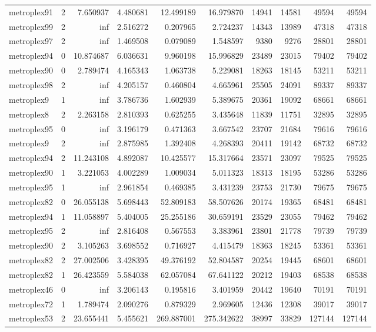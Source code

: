 \begin{longtable}{|l|r|r|r|r|r|r|r|r|r|}
metroplex91 & 2 & 7.650937 & 4.480681 & 12.499189 & 16.979870 & 14941 & 14581 & 49594 & 49594 \\
metroplex99 & 2 & inf & 2.516272 & 0.207965 & 2.724237 & 14343 & 13989 & 47318 & 47318 \\
metroplex97 & 2 & inf & 1.469508 & 0.079089 & 1.548597 & 9380 & 9276 & 28801 & 28801 \\
metroplex94 & 0 & 10.874687 & 6.036631 & 9.960198 & 15.996829 & 23489 & 23015 & 79402 & 79402 \\
metroplex90 & 0 & 2.789474 & 4.165343 & 1.063738 & 5.229081 & 18263 & 18145 & 53211 & 53211 \\
metroplex98 & 2 & inf & 4.205157 & 0.460804 & 4.665961 & 25505 & 24091 & 89337 & 89337 \\
metroplex9 & 1 & inf & 3.786736 & 1.602939 & 5.389675 & 20361 & 19092 & 68661 & 68661 \\
metroplex8 & 2 & 2.263158 & 2.810393 & 0.625255 & 3.435648 & 11839 & 11751 & 32895 & 32895 \\
metroplex95 & 0 & inf & 3.196179 & 0.471363 & 3.667542 & 23707 & 21684 & 79616 & 79616 \\
metroplex9 & 2 & inf & 2.875985 & 1.392408 & 4.268393 & 20411 & 19142 & 68732 & 68732 \\
metroplex94 & 2 & 11.243108 & 4.892087 & 10.425577 & 15.317664 & 23571 & 23097 & 79525 & 79525 \\
metroplex90 & 1 & 3.221053 & 4.002289 & 1.009034 & 5.011323 & 18313 & 18195 & 53286 & 53286 \\
metroplex95 & 1 & inf & 2.961854 & 0.469385 & 3.431239 & 23753 & 21730 & 79675 & 79675 \\
metroplex82 & 0 & 26.055138 & 5.698443 & 52.809183 & 58.507626 & 20174 & 19365 & 68481 & 68481 \\
metroplex94 & 1 & 11.058897 & 5.404005 & 25.255186 & 30.659191 & 23529 & 23055 & 79462 & 79462 \\
metroplex95 & 2 & inf & 2.816408 & 0.567553 & 3.383961 & 23801 & 21778 & 79739 & 79739 \\
metroplex90 & 2 & 3.105263 & 3.698552 & 0.716927 & 4.415479 & 18363 & 18245 & 53361 & 53361 \\
metroplex82 & 2 & 27.002506 & 3.428395 & 49.376192 & 52.804587 & 20254 & 19445 & 68601 & 68601 \\
metroplex82 & 1 & 26.423559 & 5.584038 & 62.057084 & 67.641122 & 20212 & 19403 & 68538 & 68538 \\
metroplex46 & 0 & inf & 3.206143 & 0.195816 & 3.401959 & 20442 & 19640 & 70191 & 70191 \\
metroplex72 & 1 & 1.789474 & 2.090276 & 0.879329 & 2.969605 & 12436 & 12308 & 39017 & 39017 \\
metroplex53 & 2 & 23.655441 & 5.455621 & 269.887001 & 275.342622 & 38997 & 33829 & 127144 & 127144 \\
\end{longtable}
